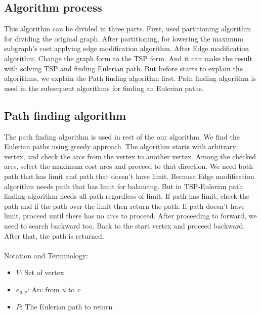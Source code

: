 \documentclass{article}
\begin{document}
\subsection{Algorithm process}


This algorithm can be divided in three parts. First, used partitioning algorithm for dividing the original graph. After partitioning, for lowering the maximum subgraph's cost applying edge modification algorithm. After Edge modification algorithm, Change the graph form to the TSP form. And it can make the result with solving TSP and finding Eulerian path. But before starts to explain the algorithms, we explain the Path finding algorithm first. Path finding algorithm is used in the subsequent algorithms for finding an Eulerian paths.
\subsection{Path finding algorithm}
The path finding algorithm is used in rest of the our algorithm. We find the Eulerian paths using greedy approach. The algorithm starts with arbitrary vertex, and check the arcs from the vertex to another vertex. Among the checked arcs, select the maximum cost arcs and proceed to that direction. We need both path that has limit and path that doesn't have limit. Because Edge modification algorithm needs path that has limit for balancing. But in TSP-Eulerian path finding algorithm needs all path regardless of limit. If path has limit, check the path and if the path over the limit then return the path. If path doesn't have limit, proceed until there has no arcs to proceed. After proceeding to forward, we need to search backward too. Back to the start vertex and proceed backward. After that, the path is returned.
\\
\\ Notation and Terminology:
\begin{itemize}
    \item $V$: Set of vertex
    \item $e_{u,v}$: Arc from $u$ to $v$
    \item $P$: The Eulerian path to return
\end{itemize}
\end{document}
